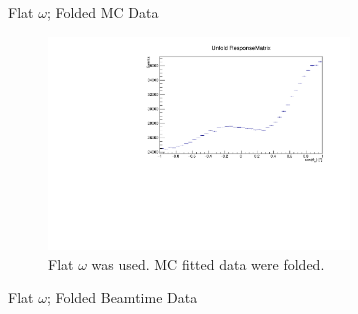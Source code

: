 \documentclass[
		10pt
		]{beamer}
\begin{document}
\begin{frame}{Flat $\omega$; Folded MC Data}
	\begin{figure}
		\includegraphics[width=8cm]{Plots/FlatMC.pdf}
		\caption{Flat $\omega$ was used. MC fitted data were folded.}
	\end{figure}
\end{frame}

\begin{frame}{Flat $\omega$; Folded Beamtime Data}
\end{frame}
\end{document}
